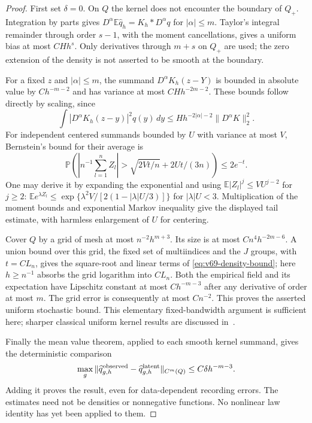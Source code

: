 \begin{proof}
First set $\delta=0$.  On $Q$ the kernel does not encounter the boundary
of $Q_+$.  Integration by parts gives
$D^\alpha\mathbb E\widehat q_h=K_h*D^\alpha q$ for $|\alpha|\le m$.
Taylor's integral remainder through order $s-1$, with the moment
cancellations, gives a uniform bias at most $CHh^s$.  Only derivatives
through $m+s$ on $Q_+$ are used; the zero extension of the density is
not asserted to be smooth at the boundary.

For a fixed $z$ and $|\alpha|\le m$, the summand
$D^\alpha K_h(z-Y)$ is bounded in absolute value by
$Ch^{-m-2}$ and has variance at most $CHh^{-2m-2}$.  These bounds
follow directly by scaling, since
\[
 \int |D^\alpha K_h(z-y)|^2q(y)\,dy
                  \le Hh^{-2|\alpha|-2}\|D^\alpha K\|_2^2.
\]
For independent centered summands bounded by $U$ with variance at most
$V$, Bernstein's bound for their average is
\[
 \mathbb P\!\left(\left|n^{-1}\sum_{l=1}^n Z_l\right|>
              \sqrt{2Vt/n}+2Ut/(3n)\right)\le2e^{-t}.
\]
One may derive it by expanding the exponential and using
$\mathbb E|Z_l|^j\le VU^{j-2}$ for $j\ge2$:
$\mathbb E e^{\lambda Z_l}\le
\exp\{\lambda^2V/[2(1-|\lambda|U/3)]\}$ for $|\lambda|U<3$.
Multiplication of the moment bounds and exponential Markov inequality
give the displayed tail estimate, with harmless enlargement of $U$
for centering.

Cover $Q$ by a grid of mesh at most $n^{-2}h^{m+3}$.  Its size is at
most $Cn^4h^{-2m-6}$.  A union bound over this grid, the fixed set of
multiindices and the $J$ groups, with $t=CL_n$, gives the square-root
and linear terms of \eqref{eq:v69-density-bound}; here $h\ge n^{-1}$
absorbs the grid logarithm into $CL_n$.  Both the empirical field and
its expectation have Lipschitz constant at most $Ch^{-m-3}$ after
any derivative of order at most $m$.  The grid error is consequently
at most $Cn^{-2}$.  This proves the asserted uniform stochastic bound.
This elementary fixed-bandwidth argument is sufficient here; sharper
classical uniform kernel results are discussed in~\cite{GineGuillou2002}.

Finally the mean value theorem, applied to each smooth kernel summand,
gives the deterministic comparison
\[
 \max_g\|\widehat q^{\rm observed}_{g,h}
             -\widehat q^{\rm latent}_{g,h}\|_{C^m(Q)}
                         \le C\delta h^{-m-3}.
\]
Adding it proves the result, even for data-dependent recording errors.
The estimates need not be densities or nonnegative functions.  No
nonlinear law identity has yet been applied to them.
\end{proof}

